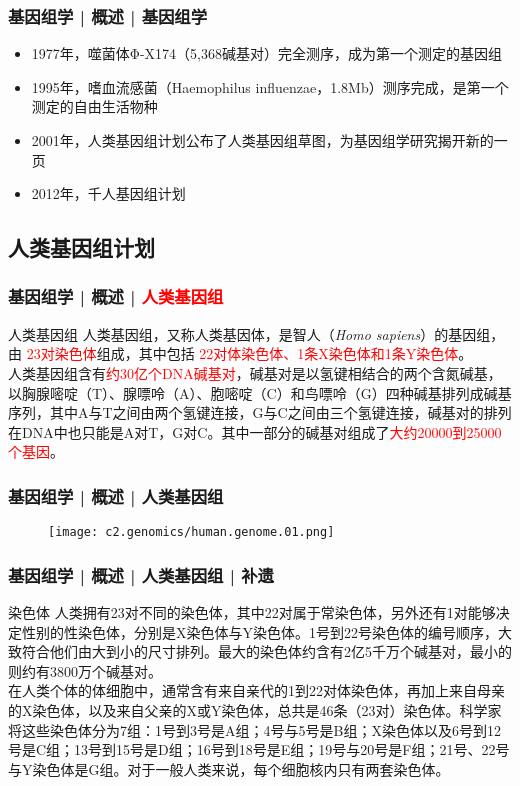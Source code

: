 \begin{frame}
  \frametitle{基因组学 | 概述 | 基因组学}
  \begin{itemize}[<+->]
    \item 1977年，噬菌体Φ-X174（5,368碱基对）完全测序，成为第一个测定的基因组
    \item 1995年，嗜血流感菌（Haemophilus influenzae，1.8Mb）测序完成，是第一个测定的自由生活物种
    \item 2001年，人类基因组计划公布了人类基因组草图，为基因组学研究揭开新的一页
    \item 2012年，千人基因组计划
  \end{itemize}
\end{frame}

\subsection{人类基因组计划}
\begin{frame}
  \frametitle{基因组学 | 概述 | \textcolor{red}{人类基因组}}
  \begin{block}{人类基因组}
    人类基因组，又称人类基因体，是智人（\textit{Homo sapiens}）的基因组，由 \textcolor{red}{23对染色体}组成，其中包括 \textcolor{red}{22对体染色体、1条X染色体和1条Y染色体}。\\
    \vspace{1em}
人类基因组含有\textcolor{red}{约30亿个DNA碱基对}，碱基对是以氢键相结合的两个含氮碱基，以胸腺嘧啶（T）、腺嘌呤（A）、胞嘧啶（C）和鸟嘌呤（G）四种碱基排列成碱基序列，其中A与T之间由两个氢键连接，G与C之间由三个氢键连接，碱基对的排列在DNA中也只能是A对T，G对C。其中一部分的碱基对组成了\textcolor{red}{大约20000到25000个基因}。 
  \end{block}
\end{frame}

\begin{frame}
  \frametitle{基因组学 | 概述 | 人类基因组}
  \begin{figure}
    \centering
    \texttt{[image: c2.genomics/human.genome.01.png]}
  \end{figure}
\end{frame}

\begin{frame}
  \frametitle{基因组学 | 概述 | 人类基因组 | 补遗}
  \begin{block}{染色体}
人类拥有23对不同的染色体，其中22对属于常染色体，另外还有1对能够决定性别的性染色体，分别是X染色体与Y染色体。1号到22号染色体的编号顺序，大致符合他们由大到小的尺寸排列。最大的染色体约含有2亿5千万个碱基对，最小的则约有3800万个碱基对。\\
\vspace{1em}
在人类个体的体细胞中，通常含有来自亲代的1到22对体染色体，再加上来自母亲的X染色体，以及来自父亲的X或Y染色体，总共是46条（23对）染色体。科学家将这些染色体分为7组：1号到3号是A组；4号与5号是B组；X染色体以及6号到12号是C组；13号到15号是D组；16号到18号是E组；19号与20号是F组；21号、22号与Y染色体是G组。对于一般人类来说，每个细胞核内只有两套染色体。
  \end{block}
\end{frame}

